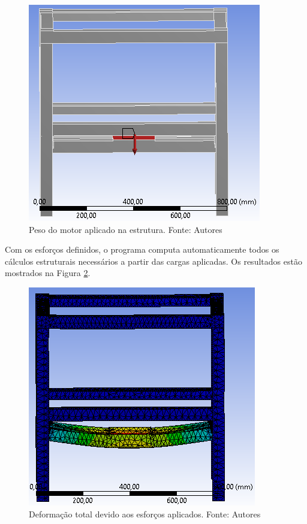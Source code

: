   \begin{figure}[H]
      \centering
      \includegraphics[scale=0.7]{figuras/carga_motor.png}
      \caption{Peso do motor aplicado na estrutura. Fonte: Autores}
      \label{fig:carga_motor}
      \end{figure}
    
      Com os esforços definidos, o programa computa automaticamente todos os cálculos estruturais necessários a partir das cargas aplicadas. 
      Os resultados estão mostrados na Figura \ref{fig:def_motor}.

  \begin{figure}[H]
      \centering
      \includegraphics[scale=0.7]{figuras/def_motor.png}
      \caption{Deformação total devido aos esforços aplicados. Fonte: Autores}
      \label{fig:def_motor}
      \end{figure}

